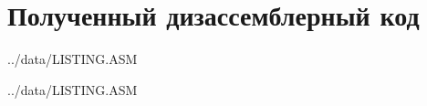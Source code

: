 \section*{Полученный дизассемблерный код}

\begin{lstinputlisting}[
	caption={Обработчик INT 8h},
	label={lst:int8h},
	linerange={1-81}
]{../data/LISTING.ASM}
\end{lstinputlisting}

\newpage
\begin{lstinputlisting}[
	caption={Подпрограмма sub\_1},
	label={lst:int8h},
	linerange={83-117}
]{../data/LISTING.ASM}
\end{lstinputlisting}
